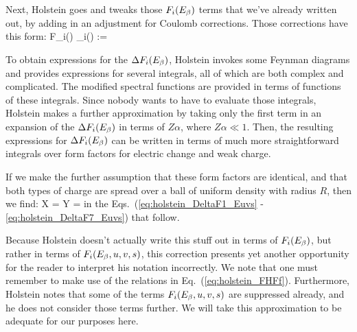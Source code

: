 Next, Holstein goes and tweaks those $F_i(E_{\beta})$ terms that we've already written out, by adding in an adjustment for Coulomb corrections.  Those corrections have this form:
\beq
	F_i(\Ebeta) \rightarrow {}_i(\Ebeta) := \FF {}
\eeq

To obtain expressions for the $\Delta F_i(E_{\beta})$, Holstein invokes some Feynman diagrams and provides expressions for several integrals, all of which are both complex and complicated.  The modified spectral functions are provided in terms of functions of these integrals.  Since nobody wants to have to evaluate those integrals, Holstein makes a further approximation by taking only the first term in an expansion of the $\Delta F_i(E_{\beta})$ in terms of $Z\alpha$, where $Z\alpha \ll 1$.  Then, the resulting expressions for $\Delta F_i(E_{\beta})$ can be written in terms of much more straightforward integrals over form factors for electric change and weak charge.  

If we make the further assumption that these form factors are identical, and that both types of charge are spread over a ball of uniform density with radius $R$, then we find:
\bea
	X = Y = 
\eea
in the Eqs.~(\ref{eq:holstein_DeltaF1_Euvs} - \ref{eq:holstein_DeltaF7_Euvs}) that follow.

Because Holstein doesn't actually write this stuff out in terms of $F_i(E_{\beta})$, but rather in terms of $F_i(E_{\beta}, u,v,s)$, this correction presents yet another opportunity for the reader to interpret his notation incorrectly.  We note that one must remember to make use of the relations in Eq.~(\ref{eq:holstein_FHFf}).  Furthermore, Holstein notes that some of the terms $F_i(E_{\beta}, u,v,s)$ are suppressed already, and he does not consider those terms further.  We will take this approximation to be adequate for our purposes here.


